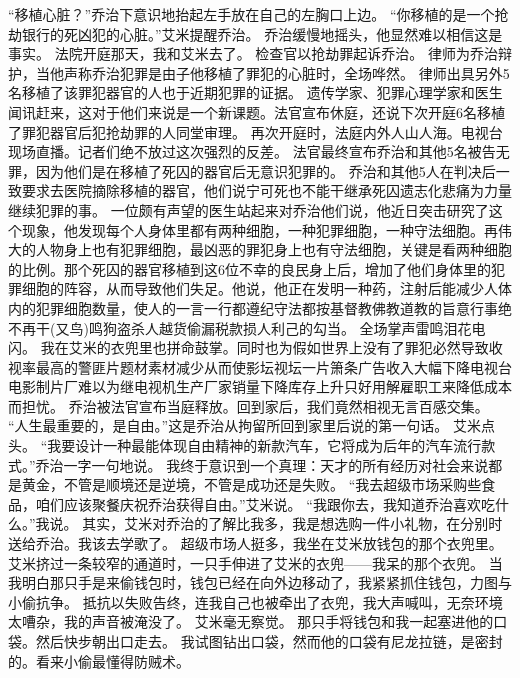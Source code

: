 \documentclass[a4paper,12pt,UTF8,twoside]{ctexbook}
\begin{document}
        “移植心脏？”乔治下意识地抬起左手放在自己的左胸口上边。 
        “你移植的是一个抢劫银行的死凶犯的心脏。”艾米提醒乔治。 
        乔治缓慢地摇头，他显然难以相信这是事实。 
        法院开庭那天，我和艾米去了。 
        检查官以抢劫罪起诉乔治。 
        律师为乔治辩护，当他声称乔治犯罪是由子他移植了罪犯的心脏时，全场哗然。 
        律师出具另外5名移植了该罪犯器官的人也于近期犯罪的证据。 
        遗传学家、犯罪心理学家和医生闻讯赶来，这对于他们来说是一个新课题。法官宣布休庭，还说下次开庭6名移植了罪犯器官后犯抢劫罪的人同堂审理。 
        再次开庭时，法庭内外人山人海。电视台现场直播。记者们绝不放过这次强烈的反差。 
        法官最终宣布乔治和其他5名被告无罪，因为他们是在移植了死囚的器官后无意识犯罪的。 
        乔治和其他5人在判决后一致要求去医院摘除移植的器官，他们说宁可死也不能干继承死囚遗志化悲痛为力量继续犯罪的事。 
        一位颇有声望的医生站起来对乔治他们说，他近日突击研究了这个现象，他发现每个人身体里都有两种细胞，一种犯罪细胞，一种守法细胞。再伟大的人物身上也有犯罪细胞，最凶恶的罪犯身上也有守法细胞，关键是看两种细胞的比例。那个死囚的器官移植到这6位不幸的良民身上后，增加了他们身体里的犯罪细胞的阵容，从而导致他们失足。他说，他正在发明一种药，注射后能减少人体内的犯罪细胞数量，使人的一言一行都遵纪守法都按基督教佛教道教的旨意行事绝不再干(又鸟)鸣狗盗杀人越货偷漏税款损人利己的勾当。 
        全场掌声雷鸣泪花电闪。 
        我在艾米的衣兜里也拼命鼓掌。同时也为假如世界上没有了罪犯必然导致收视率最高的警匪片题材素材减少从而使影坛视坛一片箫条广告收入大幅下降电视台电影制片厂难以为继电视机生产厂家销量下降库存上升只好用解雇职工来降低成本而担忧。 
        乔治被法官宣布当庭释放。回到家后，我们竟然相视无言百感交集。 
        “人生最重要的，是自由。”这是乔治从拘留所回到家里后说的第一句话。 
        艾米点头。 
        “我要设计一种最能体现自由精神的新款汽车，它将成为后年的汽车流行款式。”乔治一字一句地说。 
        我终于意识到一个真理：天才的所有经历对社会来说都是黄金，不管是顺境还是逆境，不管是成功还是失败。 
        “我去超级市场采购些食品，咱们应该聚餐庆祝乔治获得自由。”艾米说。 
        “我跟你去，我知道乔治喜欢吃什么。”我说。 
        其实，艾米对乔治的了解比我多，我是想选购一件小礼物，在分别时送给乔治。我该去学歌了。 
        超级市场人挺多，我坐在艾米放钱包的那个衣兜里。艾米挤过一条较窄的通道时，一只手伸进了艾米的衣兜——我呆的那个衣兜。 
        当我明白那只手是来偷钱包时，钱包已经在向外边移动了，我紧紧抓住钱包，力图与小偷抗争。 
        抵抗以失败告终，连我自己也被牵出了衣兜，我大声喊叫，无奈环境太嘈杂，我的声音被淹没了。 
        艾米毫无察觉。 
        那只手将钱包和我一起塞进他的口袋。然后快步朝出口走去。 
        我试图钻出口袋，然而他的口袋有尼龙拉链，是密封的。看来小偷最懂得防贼术。 
\end{document}
